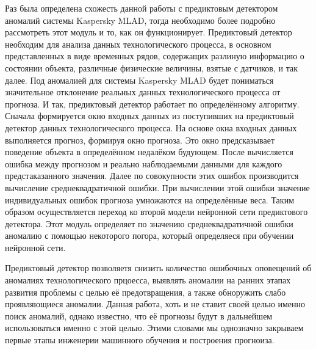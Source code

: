 {  \par \redline Раз была определена схожесть данной работы с предиктовым детектором аномалий системы Kaspersky MLAD, тогда необходимо более подробно рассмотреть этот модуль и то, как он функционирует. Предиктовый детектор необходим для анализа данных технологического процесса, в основном представленных в виде временных рядов, содержащих разлиную информацию о состоянии объекта, различные физические величины, взятые с датчиков, и так далее. Под аномалией для системы Kaspersky MLAD будет пониматься значительное отклонение реальных данных технологического процесса от прогноза. И так, предиктовый детектор работает по определённому алгоритму. Сначала формируется окно входных данных из поступивших на предиктовый детектор данных технологического процесса. На основе окна входных данных выполняется прогноз, формируя окно прогноза. Это окно предсказывает поведение объекта в определённом недалёком будующем. После вычисляется ошибка между прогнозом и реально наблюдаемыми данными для каждого предстаказанного значения. Далее по совокупности этих ошибок производится вычисление среднеквадратичной ошибки. При вычислении этой ошибки значение индивидуальных ошибок прогноза умножаются на определённые веса. Таким образом осуществляется переход ко второй модели нейронной сети предиктового детектора. Этот модуль определяет по значению среднеквадратичной ошибки аномалию с помощью некоторого погора, который определяеся при обучении нейронной сети.
  
  \par \redline Предиктовый детектор позволяетя снизить количество ошибочных оповещений об аномалиях технологического прцоесса, выявлять аномалии на ранних этапах развития проблемы с целью её предотвращения, а также обноружить слабо проявляющиеся аномалии. Данная работа, хоть и не ставит своей целью именно поиск аномалий, однако известно, что её прогнозы будут в дальнейшем использоваться именно с этой целью. Этими словами мы однозначно закрываем первые этапы инженерии машинного обучения и построения прогноиза.  

  \par
}

